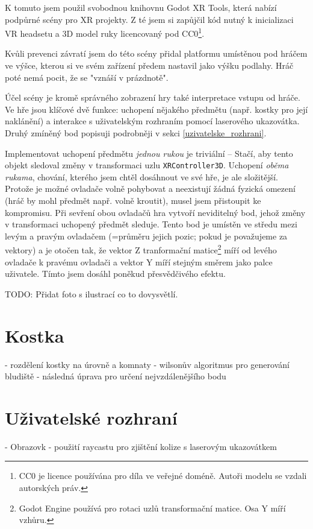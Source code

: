 K tomuto jsem použil svobodnou knihovnu Godot XR Tools, která nabízí podpůrné scény pro XR projekty. Z té jsem si zapůjčil kód nutný k inicializaci VR headsetu a 3D model ruky licencovaný pod CC0\footnote{CC0 je licence používána pro díla ve veřejné doméně. Autoři modelu se vzdali autorských práv.}.

Kvůli prevenci závratí jsem do této scény přidal platformu umístěnou pod hráčem ve výšce, kterou si ve svém zařízení předem nastavil jako výšku podlahy. Hráč poté nemá pocit, že se "vznáší v prázdnotě".

Účel scény je kromě správného zobrazení hry také interpretace vstupu od hráče. Ve hře jsou klíčové dvě funkce: uchopení nějakého předmětu (např. kostky pro její naklánění) a interakce s uživatelským rozhraním pomocí laserového ukazovátka. Druhý zmíněný bod popisuji podrobněji v sekci \ref{uzivatelske_rozhrani}.

Implementovat uchopení předmětu \textit{jednou rukou} je triviální -- Stačí, aby tento objekt sledoval změny v transformaci uzlu \texttt{XRController3D}. Uchopení \textit{oběma rukama}, chování, kterého jsem chtěl dosáhnout ve své hře, je ale složitější. Protože je možné ovladače volně pohybovat a neexistují žádná fyzická omezení (hráč by mohl předmět např. volně kroutit), musel jsem přistoupit ke kompromisu. Při sevření obou ovladačů hra vytvoří neviditelný bod, jehož změny v transformaci uchopený předmět sleduje. Tento bod je umístěn ve středu mezi levým a pravým ovladačem (=průměru jejich pozic; pokud je považujeme za vektory) a je otočen tak, že vektor Z tranformační matice\footnote{Godot Engine používá pro rotaci uzlů transformační matice. Osa Y míří vzhůru.} míří od levého ovladače k pravému ovladači a vektor Y míří stejným směrem jako palce uživatele. Tímto jsem dosáhl poněkud přesvědčivého efektu.

TODO: Přidat foto s ilustrací co to dovysvětlí.

\section{Kostka}

- rozdělení kostky na úrovně a komnaty
- wilsonův algoritmus pro generování bludiště
- následná úprava pro určení nejvzdálenějšího bodu

\label{uzivatelske_rozhrani}
\section{Uživatelské rozhraní}

- Obrazovk
- použití raycastu pro zjištění kolize s laserovým ukazovátkem